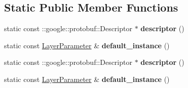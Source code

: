 \subsection*{Static Public Member Functions}
\begin{DoxyCompactItemize}
\item 
\mbox{\label{classcaffe_1_1_layer_parameter_a7e70d35c0d43c83a8bf3a816496bffac}} 
static const \+::google\+::protobuf\+::\+Descriptor $\ast$ {\bfseries descriptor} ()
\item 
\mbox{\label{classcaffe_1_1_layer_parameter_a7401b38b8aaa15d8070024c39bf2adeb}} 
static const \mbox{\hyperlink{classcaffe_1_1_layer_parameter}{Layer\+Parameter}} \& {\bfseries default\+\_\+instance} ()
\item 
\mbox{\label{classcaffe_1_1_layer_parameter_a75f83f9a39e8fff6b7be2274201ede9e}} 
static const \+::google\+::protobuf\+::\+Descriptor $\ast$ {\bfseries descriptor} ()
\item 
\mbox{\label{classcaffe_1_1_layer_parameter_a8538e1a8b23e92a908f16a6ea9cabe2a}} 
static const \mbox{\hyperlink{classcaffe_1_1_layer_parameter}{Layer\+Parameter}} \& {\bfseries default\+\_\+instance} ()
\end{DoxyCompactItemize}
